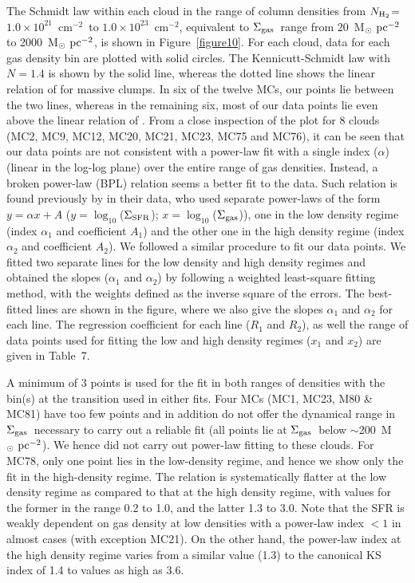 \documentclass[iop]{emulateapj}
\newcommand{\msunpc}{M$_{\odot}~{\rm pc}^{-2}$}
\newcommand{\sigsfr}{$\Sigma_{\rm SFR}$}
\newcommand{\siggas}{$\Sigma_{\rm gas}$}
\newcommand{\cmsq}{cm$^{-2}$}
\newcommand{\nhtwo}{$N_{{\rm H}_2}$}
\begin{document}
The Schmidt law within each cloud in the range of column densities from 
\nhtwo=$1.0\times10^{21}$~\cmsq\ to $1.0\times10^{23}$~\cmsq, 
equivalent to \siggas~range from 20~\msunpc~ to 2000~\msunpc,
is shown in Figure~\ref{figure10}. For each cloud, data for each gas density bin are 
plotted with solid circles. The Kennicutt-Schmidt law with $N=1.4$ is shown by the
solid line, whereas the dotted line shows the linear relation of \citet{wu+05}
for massive clumps. In six of the twelve MCs, our points lie between the two
lines, whereas in the remaining six, most of our data points lie even above
the linear relation of \citet{wu+05}.
From a close inspection of the plot for 8 clouds (MC2, MC9, MC12, MC20, MC21, 
MC23, MC75 and MC76), it can be seen that
our data points are not consistent with a power-law fit with a single index ($\alpha$)
(linear in the log-log plane) over the entire range of gas densities. Instead, 
a broken power-law (BPL) relation seems a better fit to the 
data. Such relation is found previously by \citet{heiderman+10} in their data, 
who used separate power-laws 
of the form $y=\alpha x+A$ ($y=\log_{10}$(\sigsfr); $x=\log_{10}$(\siggas)),
one in the low density regime (index $\alpha_1$ and coefficient $A_1$) 
and the other one in the high density regime (index $\alpha_2$ and coefficient $A_2$).
We followed a similar procedure to fit our data points. We fitted two separate
lines for the low density and high density regimes and obtained the slopes 
($\alpha_1$ and $\alpha_2$) by following a weighted least-square fitting method,
with the weights defined as the inverse square of the errors. 
The best-fitted lines are shown in the figure, where we also give
the slopes $\alpha_1$ and $\alpha_2$ for each line. The regression coefficient
for each line ($R_1$ and $R_2$), as well the range of data points used for
fitting the low and high density regimes ($x_1$ and $x_2$) are given in Table~7.

A minimum of 3 points is used for the fit in both ranges of
densities with the bin(s) at the transition used in either fits.
Four MCs (MC1, MC23, M80 \& MC81) have too few points and in addition do not
offer the dynamical range in \siggas\ necessary to carry out a reliable fit
(all points lie at \siggas\ below $\sim$200~\msunpc). We hence did not
carry out power-law fitting to these clouds.
For MC78, only one point lies in the low-density regime, and hence we show
only the fit in the high-density regime. The relation is systematically flatter 
at the low density regime as compared
to that at the high density regime, with values for the former in the range
0.2 to 1.0, and the latter 1.3 to 3.0. Note that the SFR is weakly dependent 
on gas density at low densities with a power-law index $<1$ in almost cases 
(with exception MC21).
On the other hand, the power-law index at the high density regime varies 
from a similar value (1.3) to the canonical KS index of 1.4 to values as high as 3.6.
\end{document}
